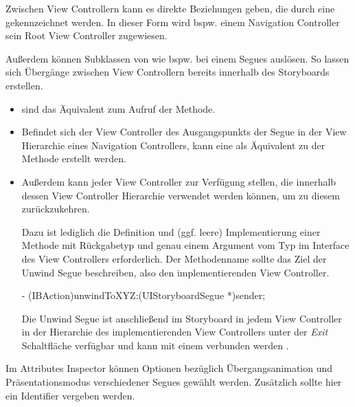\documentclass[parskip=half, final]{scrreprt}
\begin{document}
Zwischen View Controllern kann es direkte Beziehungen geben, die durch eine  gekennzeichnet werden. In dieser Form wird bspw. einem Navigation Controller sein Root View Controller zugewiesen.

Außerdem können Subklassen von  wie bspw.  bei einem  Segues auslösen. So lassen sich Übergänge zwischen View Controllern bereits innerhalb des Storyboards erstellen.

\begin{itemize}
\item {} sind das Äquivalent zum Aufruf der  Methode.
\item Befindet sich der View Controller des Ausgangspunkts der Segue in der View Hierarchie eines Navigation Controllers, kann eine  als Äquivalent zu der  Methode erstellt werden.
\item Außerdem kann jeder View Controller  zur Verfügung stellen, die innerhalb dessen View Controller Hierarchie verwendet werden können, um zu diesem zurückzukehren.

Dazu ist lediglich die Definition und (ggf. leere) Implementierung einer Methode mit Rückgabetyp  und genau einem Argument vom Typ  im Interface des View Controllers erforderlich. Der Methodenname sollte das Ziel der Unwind Segue beschreiben, also den implementierenden View Controller.

\begin{objclst}
- (IBAction)unwindToXYZ:(UIStoryboardSegue *)sender;
\end{objclst}

Die Unwind Segue ist anschließend im Storyboard in jedem View Controller in der Hierarchie des implementierenden View Controllers unter der \emph{Exit} Schaltfläche verfügbar und kann mit einem  verbunden werden .


\end{itemize}

Im Attributes Inspector können Optionen bezüglich Übergangsanimation und Präsentationsmodus verschiedener Segues gewählt werden. Zusätzlich sollte hier ein Identifier vergeben werden.
\end{document}
